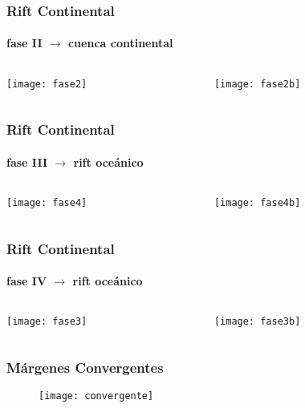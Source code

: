 \documentclass{beamer}
\begin{document}
\begin{frame}
\frametitle{Rift Continental}
\framesubtitle{fase II $\rightarrow$ cuenca continental}
\begin{center}
\begin{columns}
		\begin{column}{.4\linewidth}
		 \texttt{[image: fase2]}
		\end{column}
		\begin{column}{.5\linewidth}
			 \texttt{[image: fase2b]}
		\end{column}
\end{columns}
\end{center}
\end{frame}
\begin{frame}
\frametitle{Rift Continental}
\framesubtitle{fase III $\rightarrow$ rift oceánico}
\begin{center}
\begin{columns}
		\begin{column}{.4\linewidth}
		 \texttt{[image: fase4]}
		\end{column}
		\begin{column}{.5\linewidth}
			 \texttt{[image: fase4b]}
		\end{column}
\end{columns}
\end{center}
\end{frame}
\begin{frame}
\frametitle{Rift Continental}
\framesubtitle{fase IV $\rightarrow$ rift oceánico}
\begin{center}
\begin{columns}
		\begin{column}{.7\linewidth}
		 \texttt{[image: fase3]}
		\end{column}
		\begin{column}{.3\linewidth}
			 \texttt{[image: fase3b]}
		\end{column}
\end{columns}
\end{center}
\end{frame}
\begin{frame}
\frametitle{Márgenes Convergentes}
\begin{center}
\begin{figure}
\texttt{[image: convergente]}
\end{figure}
\end{center}
\end{frame}
\end{document}
